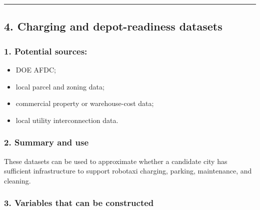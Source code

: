 \documentclass[10pt,a4paper]{article}
\providecommand{\tightlist}{\setlength{\itemsep}{0pt}\setlength{\parskip}{0pt}}
\begin{document}
\begin{center}\rule{0.5\linewidth}{0.5pt}\end{center}

\hypertarget{charging-and-depot-readiness-datasets}{%
\subsection{4. Charging and depot-readiness datasets}\label{charging-and-depot-readiness-datasets}}

\hypertarget{potential-sources-3}{%
\subsubsection{1. Potential sources:}\label{potential-sources-3}}

\begin{itemize}
\tightlist
\item
  DOE AFDC;
\item
  local parcel and zoning data;
\item
  commercial property or warehouse-cost data;
\item
  local utility interconnection data.
\end{itemize}

\hypertarget{summary-and-use-3}{%
\subsubsection{2. Summary and use}\label{summary-and-use-3}}

These datasets can be used to approximate whether a candidate city has sufficient infrastructure to support robotaxi charging, parking, maintenance, and cleaning.

\hypertarget{variables-that-can-be-constructed-3}{%
\subsubsection{3. Variables that can be constructed}\label{variables-that-can-be-constructed-3}}
\end{document}
